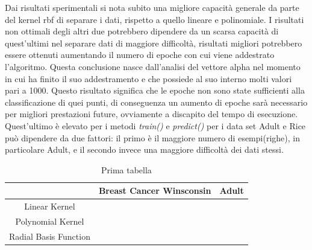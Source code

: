 \documentclass{article}
\begin{document}
    Dai risultati sperimentali si nota subito una migliore capacità generale da parte del kernel rbf di separare i dati, rispetto a quello lineare e polinomiale. I risultati non ottimali degli altri due potrebbero dipendere da un scarsa capacità di quest'ultimi nel separare dati di maggiore difficoltà, risultati migliori potrebbero essere ottenuti aumentando il numero di epoche con cui viene addestrato l'algoritmo. 
	Questa conclusione nasce dall'analisi del vettore alpha nel momento in cui ha finito il suo addestramento e che possiede al suo interno molti valori pari a 1000. Questo risultato significa che le epoche non sono state sufficienti alla classificazione di quei punti, di conseguenza un aumento di epoche sarà necessario per migliori prestazioni future, ovviamente a discapito del tempo di esecuzione.
	Quest'ultimo è elevato per i metodi \textit{train()} e \textit{predict()} per i data set Adult e Rice può dipendere da due fattori: il primo è il maggiore numero di esempi(righe), in particolare Adult, e il secondo invece una maggiore difficoltà dei dati stessi.
	\newpage
	
\begin{table}[htbp]
	\centering
	\begin{tabular}{|c|c|c|}
	  \hline
	  \multicolumn{1}{|c|}{} & \multicolumn{1}{c|}{Breast Cancer Winsconsin} & \multicolumn{1}{c|}{Adult} \\
	  \hline
	  \multirow{3}{*}{Linear Kernel} & & \\
	  & & \\
	  & & \\
	  \hline
	  \multirow{3}{*}{Polynomial Kernel} & & \\
	  & & \\
	  & & \\
	  \hline
	  \multirow{3}{*}{Radial Basis Function} & & \\
	  & & \\
	  & & \\
	  \hline
	\end{tabular}
	\caption{Prima tabella}
  \end{table}
  
\end{document}
